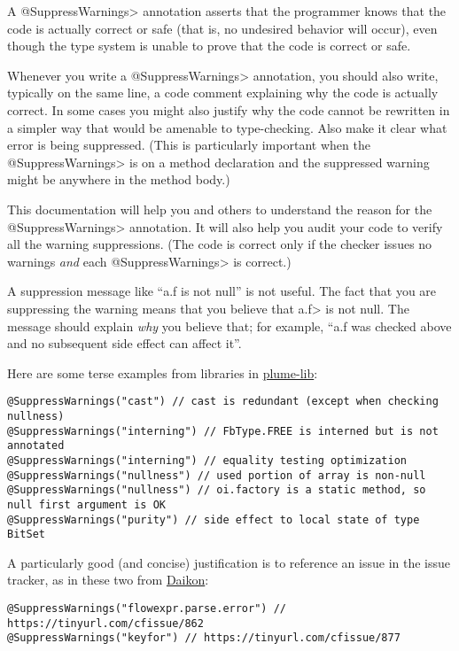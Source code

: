 A \<@SuppressWarnings> annotation asserts that the programmer knows that
the code is actually correct or safe (that is, no undesired behavior will
occur), even though the type system is unable to prove that the code is
correct or safe.

Whenever you write a \<@SuppressWarnings> annotation, you should also
write, typically on the same line, a code comment
explaining why the code is actually correct.  In some cases you might also
justify why the code cannot be rewritten in a simpler way that would be
amenable to type-checking.  Also make it clear what error is being
suppressed.  (This is particularly important when the \<@SuppressWarnings> is
on a method declaration and the suppressed warning might be anywhere in the
method body.)

This documentation will help you and others to understand the reason for
the \<@SuppressWarnings> annotation.  It will also help you audit your code
to verify all the warning suppressions.  (The code is correct only if the
checker issues no warnings \emph{and} each \<@SuppressWarnings> is correct.)

A suppression message like ``a.f is not null'' is not useful.  The fact
that you are suppressing the warning means that you believe that \<a.f> is
not null.  The message should explain \emph{why} you believe that; for
example, ``a.f was checked above and no subsequent side effect can affect it''.

Here are some terse examples from libraries in \href{https://github.com/plume-lib/}{plume-lib}:

\begin{Verbatim}
@SuppressWarnings("cast") // cast is redundant (except when checking nullness)
@SuppressWarnings("interning") // FbType.FREE is interned but is not annotated
@SuppressWarnings("interning") // equality testing optimization
@SuppressWarnings("nullness") // used portion of array is non-null
@SuppressWarnings("nullness") // oi.factory is a static method, so null first argument is OK
@SuppressWarnings("purity") // side effect to local state of type BitSet
\end{Verbatim}

A particularly good (and concise) justification is to reference an issue in
the issue tracker, as in these two from \href{https://plse.cs.washington.edu/daikon/}{Daikon}:

\begin{Verbatim}
@SuppressWarnings("flowexpr.parse.error") // https://tinyurl.com/cfissue/862
@SuppressWarnings("keyfor") // https://tinyurl.com/cfissue/877
\end{Verbatim}


